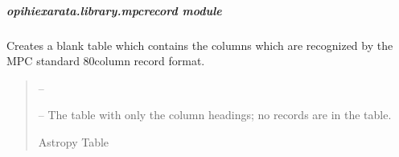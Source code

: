 \documentclass[letterpaper,11pt,english]{sphinxmanual}
\begin{document}
\sphinxstepscope


\subparagraph{opihiexarata.library.mpcrecord module}
\label{\detokenize{code/opihiexarata.library.mpcrecord:module-opihiexarata.library.mpcrecord}}\label{\detokenize{code/opihiexarata.library.mpcrecord:opihiexarata-library-mpcrecord-module}}\label{\detokenize{code/opihiexarata.library.mpcrecord::doc}}

\begin{savenotes}\begin{fulllineitems}
\label{\detokenize{code/opihiexarata.library.mpcrecord:opihiexarata.library.mpcrecord.blank_minor_planet_table}}
\pysigstartsignatures
{}
\pysigstopsignatures
\sphinxAtStartPar
Creates a blank table which contains the columns which are recognized by
the MPC standard 80\sphinxhyphen{}column record format.
\begin{quote}\begin{description}
\sphinxAtStartPar
{} – 

\sphinxAtStartPar
{} – The table with only the column headings; no records are in the table.

\sphinxAtStartPar
Astropy Table

\end{description}\end{quote}

\end{fulllineitems}\end{savenotes}

\end{document}
